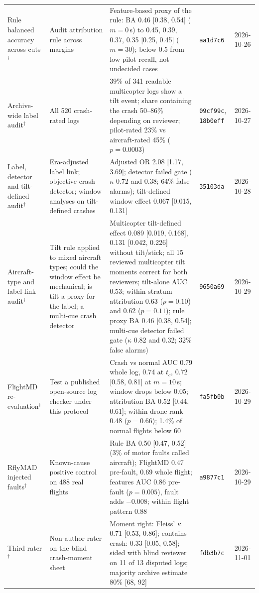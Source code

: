 \documentclass[preprint,12pt]{elsarticle}
\begin{document}
{\begin{longtable}{@{}p{}p{}p{}p{}p{}@{}}
Rule balanced accuracy across cuts$^\dagger$ & Audit attribution rule across margins & Feature-based proxy of the rule: BA 0.46 [0.38, 0.54] ($m=0$\,s) to 0.45, 0.39, 0.37, 0.35 [0.25, 0.45] ($m=30$); below 0.5 from low pilot recall, not undecided cases & \texttt{aa1d7c6} & 2026-10-26 \\
Archive-wide label audit$^\dagger$ & All 520 crash-rated logs & 39\% of 341 readable multicopter logs show a tilt event; share containing the crash 50--86\% depending on reviewer; pilot-rated 23\% vs aircraft-rated 45\% ($p=0.0003$) & \texttt{09cf99c}, \texttt{18b0eff} & 2026-10-27 \\
Label, detector and tilt-defined audit$^\dagger$ & Era-adjusted label link; objective crash detector; window analyses on tilt-defined crashes & Adjusted OR 2.08 [1.17, 3.69]; detector failed gate ($\kappa$ 0.72 and 0.38; 64\% false alarms); tilt-defined window effect 0.067 [0.015, 0.131] & \texttt{35103da} & 2026-10-28 \\
Aircraft-type and label-link audit$^\dagger$ & Tilt rule applied to mixed aircraft types; could the window effect be mechanical; is tilt a proxy for the label; a multi-cue crash detector & Multicopter tilt-defined effect 0.089 [0.019, 0.168], 0.131 [0.042, 0.226] without tilt/stick; all 15 reviewed multicopter tilt moments correct for both reviewers; tilt-alone AUC 0.53; within-stratum attribution 0.63 ($p=0.10$) and 0.62 ($p=0.11$); rule proxy BA 0.46 [0.38, 0.54]; multi-cue detector failed gate ($\kappa$ 0.82 and 0.32; 32\% false alarms) & \texttt{9650a69} & 2026-10-29 \\
FlightMD re-evaluation$^\dagger$ & Test a published open-source log checker under this protocol & Crash vs normal AUC 0.79 whole log, 0.74 at $t_c$, 0.72 [0.58, 0.81] at $m=10$\,s; window drops below 0.05; attribution BA 0.52 [0.44, 0.61]; within-drone rank 0.48 ($p=0.66$); 1.4\% of normal flights below 60 & \texttt{fa5fb0b} & 2026-10-29 \\
RflyMAD injected faults$^\dagger$ & Known-cause positive control on 488 real flights & Rule BA 0.50 [0.47, 0.52] (3\% of motor faults called aircraft); FlightMD 0.47 pre-fault, 0.69 whole flight; features AUC 0.86 pre-fault ($p=0.005$), fault adds $-0.008$; within flight pattern 0.88 & \texttt{a9877c1} & 2026-10-29 \\
Third rater$^\dagger$ & Non-author rater on the blind crash-moment sheet & Moment right: Fleiss' $\kappa$ 0.71 [0.53, 0.86]; contains crash: 0.33 [0.05, 0.58]; sided with blind reviewer on 11 of 13 disputed logs; majority archive estimate 80\% [68, 92] & \texttt{fdb3b7c} & 2026-11-01 \\

\end{longtable}}
\end{document}
